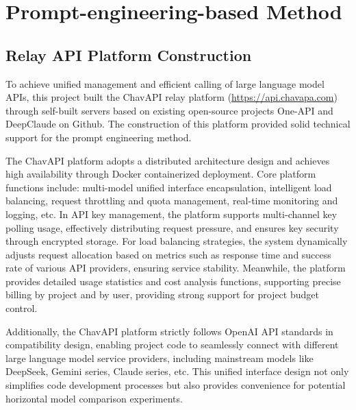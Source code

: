 \documentclass[10pt,a4paper]{article}
\begin{document}
\section{Prompt-engineering-based Method}
\subsection{Relay API Platform Construction}
To achieve unified management and efficient calling of large language model APIs, this project built the ChavAPI relay platform (\url{https://api.chavapa.com}) through self-built servers based on existing open-source projects One-API and DeepClaude on Github. The construction of this platform provided solid technical support for the prompt engineering method.

The ChavAPI platform adopts a distributed architecture design and achieves high availability through Docker containerized deployment. Core platform functions include: multi-model unified interface encapsulation, intelligent load balancing, request throttling and quota management, real-time monitoring and logging, etc. In API key management, the platform supports multi-channel key polling usage, effectively distributing request pressure, and ensures key security through encrypted storage. For load balancing strategies, the system dynamically adjusts request allocation based on metrics such as response time and success rate of various API providers, ensuring service stability. Meanwhile, the platform provides detailed usage statistics and cost analysis functions, supporting precise billing by project and by user, providing strong support for project budget control.

Additionally, the ChavAPI platform strictly follows OpenAI API standards in compatibility design, enabling project code to seamlessly connect with different large language model service providers, including mainstream models like DeepSeek, Gemini series, Claude series, etc. This unified interface design not only simplifies code development processes but also provides convenience for potential horizontal model comparison experiments.
\end{document}
